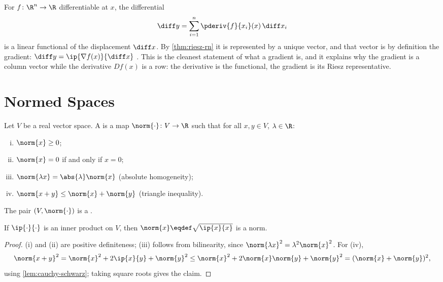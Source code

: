 \begin{eg}\label{eg:total-differential}
	For $f\colon\R^n\to\R$ differentiable at $x$, the differential
	\[
		\diff y=\sum_{i=1}^{n}\pderiv{f}{x_i}(x)\,\diff x_i
	\]
	is a linear functional of
	the displacement $\diff x$. By \autoref{thm:riesz-rn} it is represented by a unique
	vector, and that vector is by definition the gradient:
	$\diff y=\ip{\nabla f(x)}{\diff x}$ \autocite[slide 10]{fukuda2026analysis}. This is the
	cleanest statement of what a gradient is, and it explains why the gradient is a
	column vector while the derivative $Df(x)$ is a row: the derivative is the
	functional, the gradient is its Riesz representative.
\end{eg}

\section{Normed Spaces}\label{sec:met-norm}

\begin{definition}[Norm]\label{def:norm}
	Let $V$ be a real vector space. A  is a map
	$\norm{\cdot}\colon V\to\R$ such that for all $x,y\in V$, $\lambda\in\R$:
	\begin{enumerate}[(i)]
		\item $\norm{x}\geq0$;
		\item $\norm{x}=0$ if and only if $x=0$;
		\item $\norm{\lambda x}=\abs{\lambda}\norm{x}$ (absolute homogeneity);
		\item $\norm{x+y}\leq\norm{x}+\norm{y}$ (triangle inequality).
	\end{enumerate}
	The pair $(V,\norm{\cdot})$ is a .
\end{definition}

\begin{proposition}\label{prop:ip-induces-norm}
	If $\ip{\cdot}{\cdot}$ is an inner product on $V$, then
	$\norm{x}\eqdef\sqrt{\ip{x}{x}}$ is a norm.
\end{proposition}

\begin{proof}
	(i) and (ii) are positive definiteness; (iii) follows from bilinearity, since
	$\norm{\lambda x}^2=\lambda^2\norm{x}^2$. For (iv),
	\[
		\norm{x+y}^2=\norm{x}^2+2\ip{x}{y}+\norm{y}^2
		\leq\norm{x}^2+2\norm{x}\norm{y}+\norm{y}^2=(\norm{x}+\norm{y})^2,
	\]
	using \autoref{lem:cauchy-schwarz}; taking square roots gives the claim.
\end{proof}

